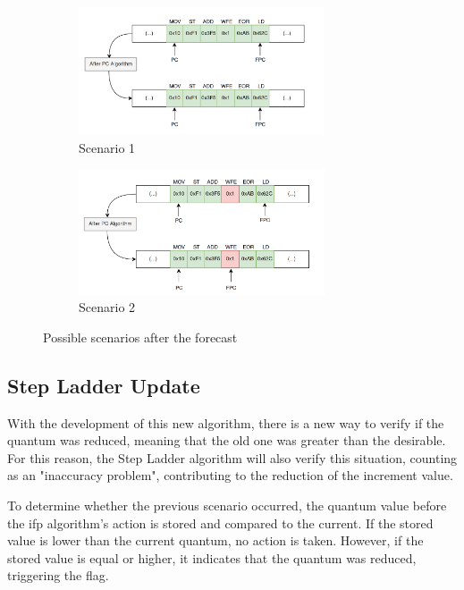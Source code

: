 \begin{figure} [H]
\centering
\begin{subfigure}{\textwidth}
    \includegraphics[width=0.8\textwidth]{Images/PCAlgrithm_noCut.png}
    \caption{ Scenario 1 }
    \label{fig:PCAlgrithm_noCut}
\end{subfigure}
\begin{subfigure}{\textwidth}
    \includegraphics[width=0.8\textwidth]{Images/PCAlgrithm_Cut.png}
    \caption{ Scenario 2 }
    \label{fig:PCAlgrithm_Cut}
\end{subfigure}
        
\caption{Possible scenarios after the forecast}
\label{fig:PCAlgorithm_differentScenarios}
\end{figure}

\subsection{Step Ladder Update}

With the development of this new algorithm, there is a new way to verify if the quantum was reduced, meaning that the old one was greater 
than the desirable. For this reason, the Step Ladder algorithm will also verify this situation, counting as an "inaccuracy problem", contributing 
to the reduction of the increment value.

To determine whether the previous scenario occurred, the quantum value before the \gls{ifp} algorithm's action is stored and compared to the current. 
If the stored value is lower than the current quantum, no action is taken. However, if the stored value is equal or higher, it indicates that 
the quantum was reduced, triggering the flag. 


